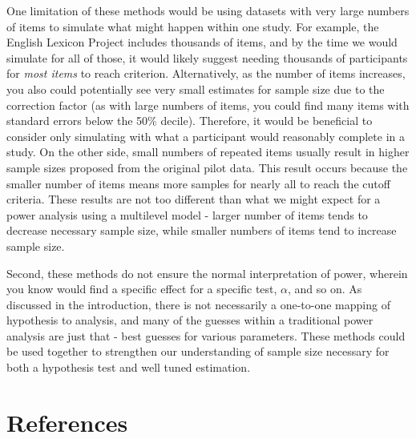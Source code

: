 \documentclass[
  man]{apa6}
\begin{document}
One limitation of these methods would be using datasets with very large numbers of items to simulate what might happen within one study. For example, the English Lexicon Project includes thousands of items, and by the time we would simulate for all of those, it would likely suggest needing thousands of participants for \emph{most items} to reach criterion. Alternatively, as the number of items increases, you also could potentially see very small estimates for sample size due to the correction factor (as with large numbers of items, you could find many items with standard errors below the 50\% decile). Therefore, it would be beneficial to consider only simulating with what a participant would reasonably complete in a study. On the other side, small numbers of repeated items usually result in higher sample sizes proposed from the original pilot data. This result occurs because the smaller number of items means more samples for nearly all to reach the cutoff criteria. These results are not too different than what we might expect for a power analysis using a multilevel model - larger number of items tends to decrease necessary sample size, while smaller numbers of items tend to increase sample size.

Second, these methods do not ensure the normal interpretation of power, wherein you know would find a specific effect for a specific test, \(\alpha\), and so on. As discussed in the introduction, there is not necessarily a one-to-one mapping of hypothesis to analysis, and many of the guesses within a traditional power analysis are just that - best guesses for various parameters. These methods could be used together to strengthen our understanding of sample size necessary for both a hypothesis test and well tuned estimation.

\newpage

\hypertarget{references}{%
\section{References}\label{references}}

\begingroup
\setlength{\parindent}{-0.5in}
\setlength{\leftskip}{0.5in}
\end{document}

